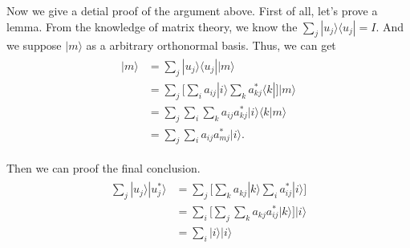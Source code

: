 \documentclass[onecolumn,notitlepage]{revtex4-1}
\def\ket#1{| #1 \rangle}
\def\bra#1{\langle #1 |}
\def\ip#1#2{\langle #1 | #2 \rangle}
\begin{document}
Now we give a detial proof of the argument above. First of all, let's prove a lemma. From the knowledge of matrix theory, we know the $\sum_{j}\ket{u_{j}}\bra{u_{j}} = I$. And we suppose $\ket{m}$ as a arbitrary orthonormal basis.
Thus, we can get 
\begin{align}
    \begin{split}
        \ket{m}  &= \sum_{j}\ket{u_{j}}\bra{u_{j}}\ket{m}       \\
        &=\sum_{j}\bigg[\sum_{i}a_{ij}\ket{i}\sum_{k}a_{kj}^*\bra{k}\bigg]\ket{m}  \\
        &= \sum_{j}\sum_{i}\sum_{k} a_{ij} a_{kj}^*\ket{i}\ip{k}{m}  \\
        &= \sum_{j}\sum_{i}a_{ij} a_{mj}^*\ket{i}.
    \end{split}
\end{align}

Then we can proof the final conclusion.
\begin{align}
    \begin{split}
        \sum_{j}\ket{u_{j}}|u_{j}^*\rangle &= \sum_{j}\bigg[ \sum_{k}a_{kj}|k\rangle \sum_{i}a_{ij}^*\ket{i}\bigg]\\
        &=  \sum_{i}\bigg[\sum_{j}\sum_{k}a_{kj}a_{ij}^*|k\rangle\bigg]\ket{i}\\
        &= \sum_{i}\ket{i}\ket{i}
    \end{split}
\end{align}
\end{document}
